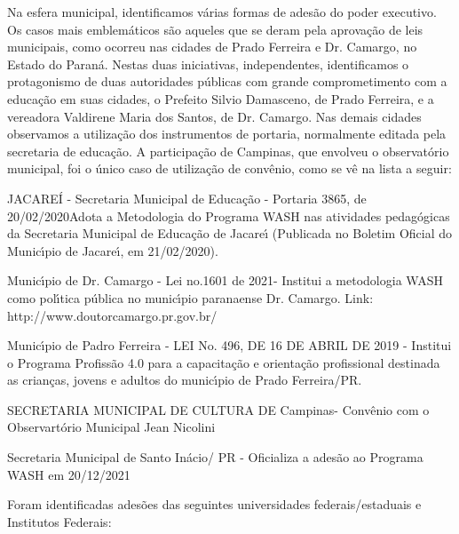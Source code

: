 \documentclass[
12pt,		%
openright,	%
twoside,  %
a4paper,			%
chapter=TITLE,		%
english,			%
french,				%
spanish,			%
brazil				%
]{USPSC-classe/USPSC}
\begin{document}
Na esfera municipal, identificamos  v\'arias formas de ades\~ao do poder executivo. Os casos mais emblem\'aticos s\~ao aqueles que se deram pela aprova\c{c}\~ao de leis municipais, como ocorreu nas cidades de Prado Ferreira e Dr. Camargo, no Estado do Paran\'a. Nestas duas iniciativas, independentes, identificamos o protagonismo de duas autoridades p\'ublicas com grande comprometimento com a educa\c{c}\~ao em suas cidades, o Prefeito Silvio Damasceno, de Prado Ferreira, e a vereadora Valdirene Maria dos Santos, de Dr. Camargo. Nas demais cidades observamos a utiliza\c{c}\~ao dos instrumentos de portaria, normalmente editada pela secretaria de educa\c{c}\~ao. A participa\c{c}\~ao de Campinas, que envolveu o observat\'orio municipal, foi o \'unico caso de utiliza\c{c}\~ao de conv\^enio, como se v\^e na lista a seguir:









\begin{alineas}
\item JACARE\'I - Secretaria Municipal de Educa\c{c}\~ao - Portaria 3865, de 20/02/2020Adota a Metodologia do Programa WASH nas atividades pedag\'ogicas da Secretaria Municipal de Educa\c{c}\~ao de Jacare\'{\i} (Publicada no Boletim Oficial do Munic\'{\i}pio de Jacare\'{\i}, em 21/02/2020).
\item Munic\'{\i}pio de Dr. Camargo - Lei no.1601 de 2021- Institui a metodologia WASH como pol\'{\i}tica p\'ublica no munic\'{\i}pio paranaense Dr. Camargo. Link: http://www.doutorcamargo.pr.gov.br/
\item Munic\'{\i}pio de Padro Ferreira - LEI No. 496, DE 16 DE ABRIL DE 2019 - Institui o Programa Profiss\~ao 4.0 para a capacita\c{c}\~ao e orienta\c{c}\~ao profissional destinada as crian\c{c}as, jovens e adultos do munic\'{\i}pio de Prado Ferreira/PR.
\item SECRETARIA MUNICIPAL DE CULTURA DE Campinas- Conv\^enio com o Observart\'orio Municipal Jean Nicolini
\item Secretaria Municipal de Santo In\'acio/ PR - Oficializa a ades\~ao ao Programa WASH em  20/12/2021
\end{alineas}

Foram identificadas ades\~oes das seguintes universidades federais/estaduais e Institutos Federais:
\end{document}
